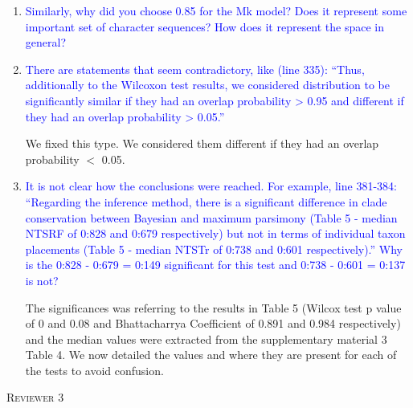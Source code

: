\documentclass[12pt,letterpaper]{article}
\renewcommand{\section}[1]{%
\bigskip
\begin{center}
\begin{Large}
\normalfont\scshape #1
\medskip
\end{Large}
\end{center}}
\begin{document}
\begin{enumerate}

\item{\textcolor{blue}{Similarly, why did you choose 0.85 for the Mk model? Does it represent some important set of character sequences? How does it represent the space in general?}}


\item{\textcolor{blue}{There are statements that seem contradictory, like (line 335): ``Thus, additionally to the Wilcoxon test results, we considered distribution to be significantly similar if they had an overlap probability > 0.95 and different if they had an overlap probability > 0.05.''}}

We fixed this type. We considered them different if they had an overlap probability $<$ 0.05.

\item{\textcolor{blue}{It is not clear how the conclusions were reached. For example, line 381-384: ``Regarding the inference method, there is a significant difference in clade conservation between Bayesian and maximum parsimony (Table 5 - median NTSRF of 0:828 and 0:679 respectively) but not in terms of individual taxon placements (Table 5 - median NTSTr of 0:738 and 0:601 respectively).'' Why is the 0:828 - 0:679 = 0:149 significant for this test and 0:738 - 0:601 = 0:137 is not?}}

The significances was referring to the results in Table 5 (Wilcox test p value of 0 and 0.08 and Bhattacharrya Coefficient of 0.891 and 0.984 respectively) and the median values were extracted from the supplementary material 3 Table 4.
We now detailed the values and where they are present for each of the tests to avoid confusion.

\end{enumerate}





%
%





\section{Reviewer 3}
\end{document}
